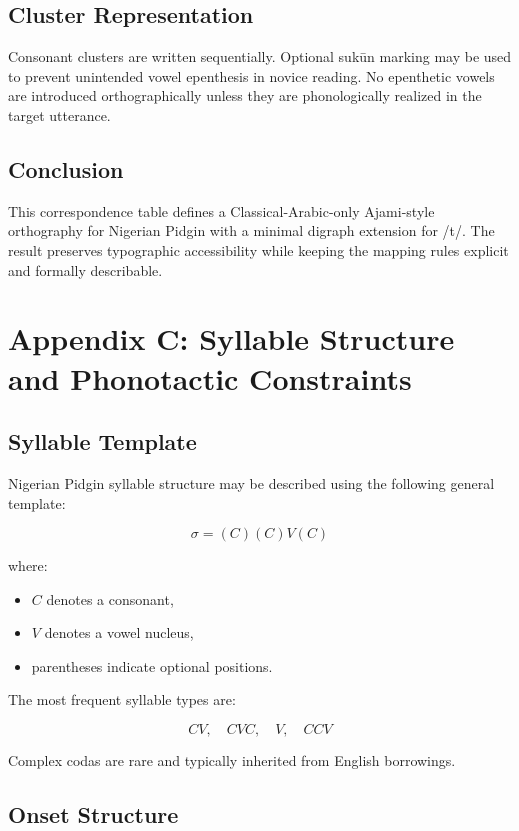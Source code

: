 \documentclass[12pt]{article}
\begin{document}
\subsection{Cluster Representation}

Consonant clusters are written sequentially. Optional suk\=un marking may be used to prevent unintended vowel epenthesis in novice reading. No epenthetic vowels are introduced orthographically unless they are phonologically realized in the target utterance.

\subsection{Conclusion}

This correspondence table defines a Classical-Arabic-only Ajami-style orthography for Nigerian Pidgin with a minimal digraph extension for /t\textipa{\textesh}/. The result preserves typographic accessibility while keeping the mapping rules explicit and formally describable.

\section{Appendix C: Syllable Structure and Phonotactic Constraints}

\subsection{Syllable Template}

Nigerian Pidgin syllable structure may be described using the following general template:

\[
\sigma = (C)(C)V(C)
\]

where:

\begin{itemize}
\item \( C \) denotes a consonant,
\item \( V \) denotes a vowel nucleus,
\item parentheses indicate optional positions.
\end{itemize}

The most frequent syllable types are:

\[
CV,\quad CVC,\quad V,\quad CCV
\]

Complex codas are rare and typically inherited from English borrowings.

\subsection{Onset Structure}
\end{document}
